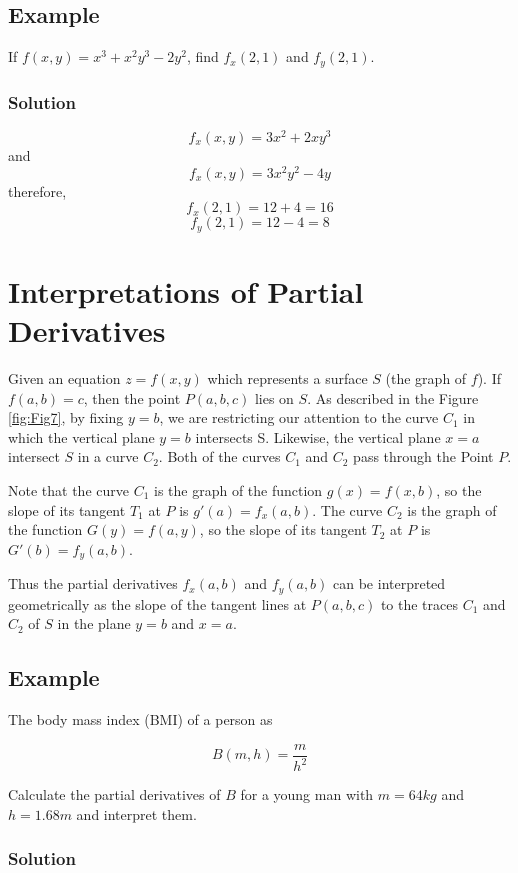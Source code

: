 \subsection{Example}
If $f(x, y)=x^3+x^2y^3-2y^2$, find $f_x(2,1)$ and $f_y(2,1)$.
\subsubsection{Solution}
$$
    f_x(x, y) = 3x^2 + 2xy^3
$$
and
$$
    f_x(x, y) = 3x^2y^2 - 4y
$$
therefore,
$$
    f_x(2, 1) = 12 + 4 = 16
$$
$$
    f_y(2, 1) = 12 - 4 = 8
$$

\section{Interpretations of Partial Derivatives}

Given an equation $z=f(x, y)$ which represents a surface $S$ (the graph of $f$). If $f(a, b)=c$, then the point $P(a, b, c)$ lies on $S$. As described in the Figure \ref{fig:Fig7}, by fixing $y=b$, we are restricting our attention to the curve $C_1$ in which the vertical plane $y=b$ intersects S. Likewise, the vertical plane $x=a$ intersect $S$ in a curve $C_2$. Both of the curves $C_1$ and $C_2$ pass through the Point $P$.

Note that the curve $C_1$ is the graph of the function $g(x)=f(x, b)$, so the slope of its tangent $T_1$ at $P$ is $g'(a)=f_x(a, b)$. The curve $C_2$ is the graph of the function $G(y)=f(a, y)$, so the slope of its tangent $T_2$ at $P$ is $G'(b)=f_y(a, b)$.

Thus the partial derivatives $f_x(a, b)$ and $f_y(a, b)$ can be interpreted geometrically as the slope of the tangent lines at $P(a, b, c)$ to the traces $C_1$ and $C_2$ of $S$ in the plane $y=b$ and $x=a$.

\subsection{Example}

\cite{calculus} The body mass index (BMI) of a person as

\begin{equation}
    \label{eq:8}
    B(m, h)=\frac{m}{h^2}
\end{equation}

Calculate the partial derivatives of $B$ for a young man with $m=64kg$ and $h=1.68m$ and interpret them.

\subsubsection{Solution}

